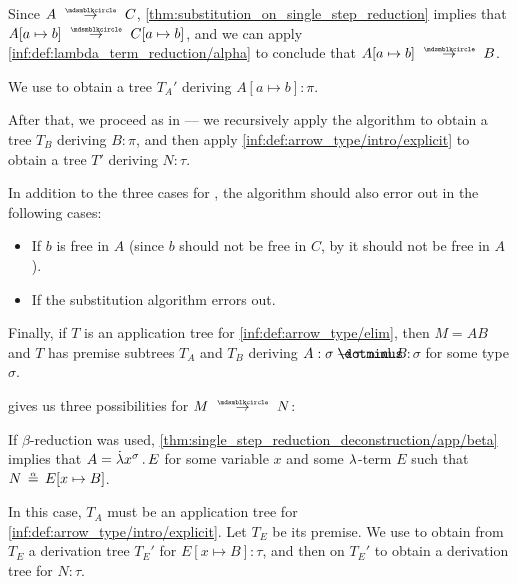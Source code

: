\begin{algorithm}
\begin{thmenum}
\begin{thmenum}
\begin{thmenum}
        Since \( A \pred C \), \cref{thm:substitution_on_single_step_reduction} implies that \( A[a \mapsto b] \pred C[a \mapsto b] \), and we can apply \ref{inf:def:lambda_term_reduction/alpha} to conclude that \( A[a \mapsto b] \pred B \).

        We use  to obtain a tree \( T_A' \) deriving \( A[a \mapsto b]: \pi \).

        After that, we proceed as in  --- we recursively apply the algorithm to obtain a tree \( T_B \) deriving \( B: \pi \), and then apply \ref{inf:def:arrow_type/intro/explicit} to obtain a tree \( T' \) deriving \( N: \tau \).

        In addition to the three cases for , the algorithm should also error out in the following cases:
        \begin{itemize}
          \item If \( b \) is free in \( A \) (since \( b \) should not be free in \( C \), by  it should not be free in \( A \)).
          \item If the substitution algorithm errors out.
        \end{itemize}
      \end{thmenum}
    \end{thmenum}

     Finally, if \( T \) is an application tree for \ref{inf:def:arrow_type/elim}, then \( M = AB \) and \( T \) has premise subtrees \( T_A \) and \( T_B \) deriving \( A: \sigma \synimplies \tau \) and \( B: \sigma \) for some type \( \sigma \).

     gives us three possibilities for \( M \pred N \):
    \begin{thmenum}
       If \( \beta \)-reduction was used, \cref{thm:single_step_reduction_deconstruction/app/beta} implies that \( A = \qabs {x^\sigma} E \) for some variable \( x \) and some \( {\mathrm \lambda} \)-term \( E \) such that \( N \aequiv E[x \mapsto B] \).

      In this case, \( T_A \) must be an application tree for \ref{inf:def:arrow_type/intro/explicit}. Let \( T_E \) be its premise. We use  to obtain from \( T_E \) a derivation tree \( T_E' \) for \( E[x \mapsto B]: \tau \), and then  on \( T_E' \) to obtain a derivation tree for \( N: \tau \).


\end{thmenum}
\end{thmenum}
\end{algorithm}
